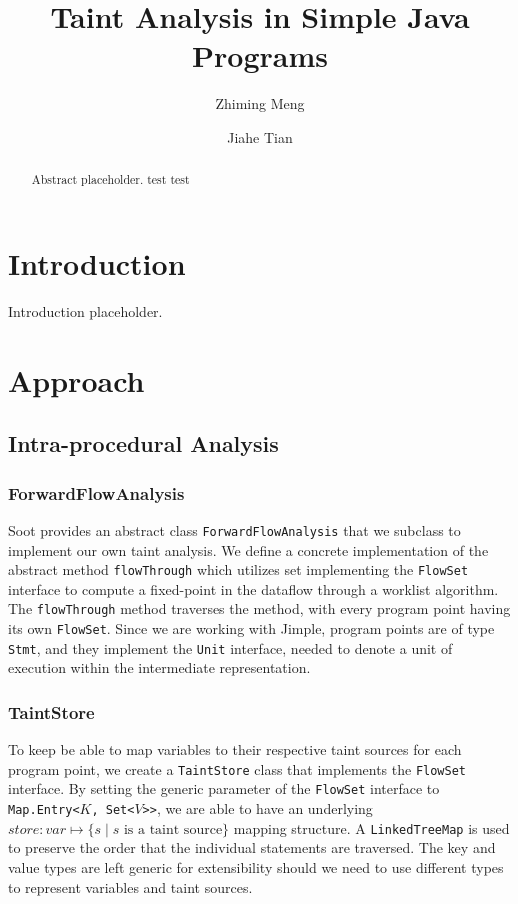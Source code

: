 \documentclass[acmsmall]{acmart}
\begin{document}
\title{Taint Analysis in Simple Java Programs}

\author{Zhiming Meng}

\author{Jiahe Tian}

\begin{abstract}
    Abstract placeholder. test test
\end{abstract}

\maketitle

\section{Introduction}
Introduction placeholder.

\section{Approach}
\subsection{Intra-procedural Analysis}
\subsubsection{ForwardFlowAnalysis} Soot provides an abstract class \texttt{ForwardFlowAnalysis} that we subclass to implement our own taint analysis. We define a concrete implementation of the abstract method \texttt{flowThrough} which utilizes set implementing the \texttt{FlowSet} interface to compute a fixed-point in the dataflow through a worklist algorithm. The \texttt{flowThrough} method traverses the method, with every program point having its own \texttt{FlowSet}. Since we are working with Jimple, program points are of type \texttt{Stmt}, and they implement the \texttt{Unit} interface, needed to denote a unit of execution within the intermediate representation.

\subsubsection{TaintStore} To keep be able to map variables to their respective taint sources for each program point, we create a \texttt{TaintStore} class that implements the \texttt{FlowSet} interface. By setting the generic parameter of the \texttt{FlowSet} interface to \texttt{Map.Entry<$K$, Set<$V$>{}>}, we are able to have an underlying $store:var \mapsto \{s \mid s \text{ is a taint source}\}$ mapping structure. A \texttt{LinkedTreeMap} is used to preserve the order that the individual statements are traversed. The key and value types are left generic for extensibility should we need to use different types to represent variables and taint sources.
\end{document}
